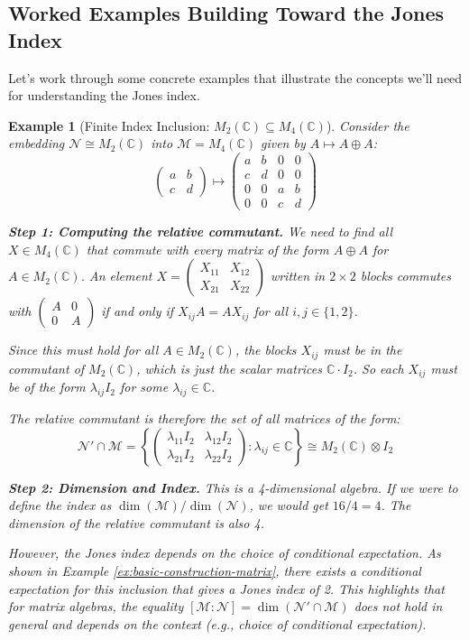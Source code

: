 \documentclass[11pt, a4paper]{article}
\theoremstyle{colored_def}
\theoremstyle{colored_thm}
\theoremstyle{colored_ex}
\newtheorem{example}{Example}[section]
\newcommand{\C}{\mathbb{C}}
\newcommand{\M}{\mathcal{M}}
\newcommand{\N}{\mathcal{N}}
\begin{document}
\subsection{Worked Examples Building Toward the Jones Index}

Let's work through some concrete examples that illustrate the concepts we'll need for understanding the Jones index.

\begin{example}[Finite Index Inclusion: $M_2(\C) \subseteq M_4(\C)$]\label{ex:finite-index-concrete}
Consider the embedding $\N \cong M_2(\C)$ into $\M = M_4(\C)$ given by $A \mapsto A \oplus A$:
$$ \begin{pmatrix} a & b \\ c & d \end{pmatrix} \mapsto \begin{pmatrix} a & b & 0 & 0 \\ c & d & 0 & 0 \\ 0 & 0 & a & b \\ 0 & 0 & c & d \end{pmatrix} $$

\textbf{Step 1: Computing the relative commutant.}
We need to find all $X \in M_4(\C)$ that commute with every matrix of the form $A \oplus A$ for $A \in M_2(\C)$. An element $X = \begin{pmatrix} X_{11} & X_{12} \\ X_{21} & X_{22} \end{pmatrix}$ written in $2 \times 2$ blocks commutes with $\begin{pmatrix} A & 0 \\ 0 & A \end{pmatrix}$ if and only if $X_{ij}A = AX_{ij}$ for all $i,j \in \{1,2\}$.

Since this must hold for all $A \in M_2(\C)$, the blocks $X_{ij}$ must be in the commutant of $M_2(\C)$, which is just the scalar matrices $\C \cdot I_2$. So each $X_{ij}$ must be of the form $\lambda_{ij} I_2$ for some $\lambda_{ij} \in \C$.

The relative commutant is therefore the set of all matrices of the form:
$$ \N' \cap \M = \left\{ \begin{pmatrix} \lambda_{11} I_2 & \lambda_{12} I_2 \\ \lambda_{21} I_2 & \lambda_{22} I_2 \end{pmatrix} : \lambda_{ij} \in \C \right\} \cong M_2(\C) \otimes I_2 $$

\textbf{Step 2: Dimension and Index.}
This is a 4-dimensional algebra. If we were to define the index as $\dim(\M)/\dim(\N)$, we would get $16/4 = 4$. The dimension of the relative commutant is also 4.

However, the Jones index depends on the choice of conditional expectation. As shown in Example \ref{ex:basic-construction-matrix}, there exists a conditional expectation for this inclusion that gives a Jones index of 2. This highlights that for matrix algebras, the equality $[\M:\N] = \dim(\N' \cap \M)$ does not hold in general and depends on the context (e.g., choice of conditional expectation).
\end{example}
\end{document}
